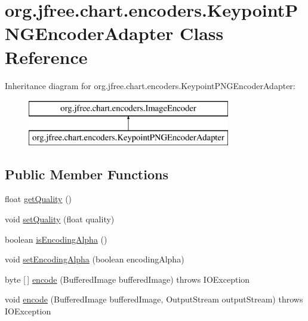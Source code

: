 \hypertarget{classorg_1_1jfree_1_1chart_1_1encoders_1_1_keypoint_p_n_g_encoder_adapter}{}\section{org.\+jfree.\+chart.\+encoders.\+Keypoint\+P\+N\+G\+Encoder\+Adapter Class Reference}
\label{classorg_1_1jfree_1_1chart_1_1encoders_1_1_keypoint_p_n_g_encoder_adapter}
Inheritance diagram for org.\+jfree.\+chart.\+encoders.\+Keypoint\+P\+N\+G\+Encoder\+Adapter\+:\begin{figure}[H]
\begin{center}
\leavevmode
\includegraphics[height=2.000000cm]{classorg_1_1jfree_1_1chart_1_1encoders_1_1_keypoint_p_n_g_encoder_adapter}
\end{center}
\end{figure}
\subsection*{Public Member Functions}
\begin{DoxyCompactItemize}
\item 
float \mbox{\hyperlink{classorg_1_1jfree_1_1chart_1_1encoders_1_1_keypoint_p_n_g_encoder_adapter_ab92d602383fbc7db9084a9c7a5ecd0c5}{get\+Quality}} ()
\item 
void \mbox{\hyperlink{classorg_1_1jfree_1_1chart_1_1encoders_1_1_keypoint_p_n_g_encoder_adapter_a4841320bd32da29b1de4fb3c09d80234}{set\+Quality}} (float quality)
\item 
boolean \mbox{\hyperlink{classorg_1_1jfree_1_1chart_1_1encoders_1_1_keypoint_p_n_g_encoder_adapter_a73ca86c91d8420342f9993c0286e0408}{is\+Encoding\+Alpha}} ()
\item 
void \mbox{\hyperlink{classorg_1_1jfree_1_1chart_1_1encoders_1_1_keypoint_p_n_g_encoder_adapter_aa033b27927358b154fa3eb7193454e14}{set\+Encoding\+Alpha}} (boolean encoding\+Alpha)
\item 
byte \mbox{[}$\,$\mbox{]} \mbox{\hyperlink{classorg_1_1jfree_1_1chart_1_1encoders_1_1_keypoint_p_n_g_encoder_adapter_addd4646d4405db17c71f6ab02265705f}{encode}} (Buffered\+Image buffered\+Image)  throws I\+O\+Exception 
\item 
void \mbox{\hyperlink{classorg_1_1jfree_1_1chart_1_1encoders_1_1_keypoint_p_n_g_encoder_adapter_ae839184a415b924b8ee0a47c5df1234d}{encode}} (Buffered\+Image buffered\+Image, Output\+Stream output\+Stream)  throws I\+O\+Exception 
\end{DoxyCompactItemize}


